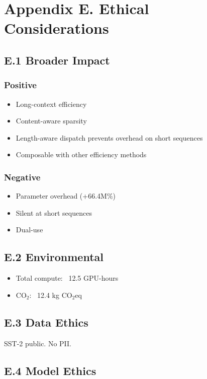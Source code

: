 \section{Appendix E. Ethical Considerations}

\subsection{E.1 Broader Impact}

\subsubsection{Positive}
\begin{itemize}
\item Long-context efficiency
\item Content-aware sparsity
\item Length-aware dispatch prevents overhead on short sequences
\item Composable with other efficiency methods

\end{itemize}
\subsubsection{Negative}
\begin{itemize}
\item Parameter overhead (+66.4M\%)
\item Silent at short sequences
\item Dual-use

\end{itemize}
\subsection{E.2 Environmental}

\begin{itemize}
\item Total compute: ~12.5 GPU-hours
\item CO$_2$: ~12.4 kg CO$_2$eq

\end{itemize}
\subsection{E.3 Data Ethics}

SST-2 public. No PII.

\subsection{E.4 Model Ethics}

